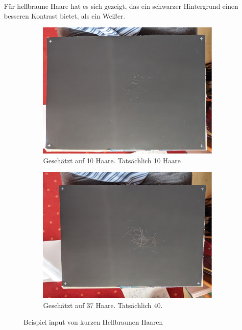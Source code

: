 \documentclass[german,a4paper, 12pt]{llncs}
\begin{document}
Für hellbraune Haare hat es sich gezeigt, das ein schwarzer Hintergrund einen besseren Kontrast bietet, als ein Weißer.

\begin{figure}
	\centering
	\begin{subfigure}[b]{0.475\textwidth}
		\centering
		\includegraphics[width=\textwidth]{figJan/IMG_20200325_133957_10.jpg}
		\caption[]{Geschätzt auf 10 Haare. Tatsächlich 10 Haare}
		\label{img:tstJan1} 
	\end{subfigure}
	\hfill
	\begin{subfigure}[b]{0.475\textwidth} 
		\centering
		\includegraphics[width=\textwidth]{figJan/IMG_20200325_134303_40.jpg}
		\caption[]{Geschätzt auf 37 Haare. Tatsächlich 40.}
		\label{img:tstJan2}
	\end{subfigure}
	\caption[  ]
	{\small Beispiel input von kurzen Hellbraunen Haaren} 
	\label{img:tstJan}
\end{figure}
\end{document}
